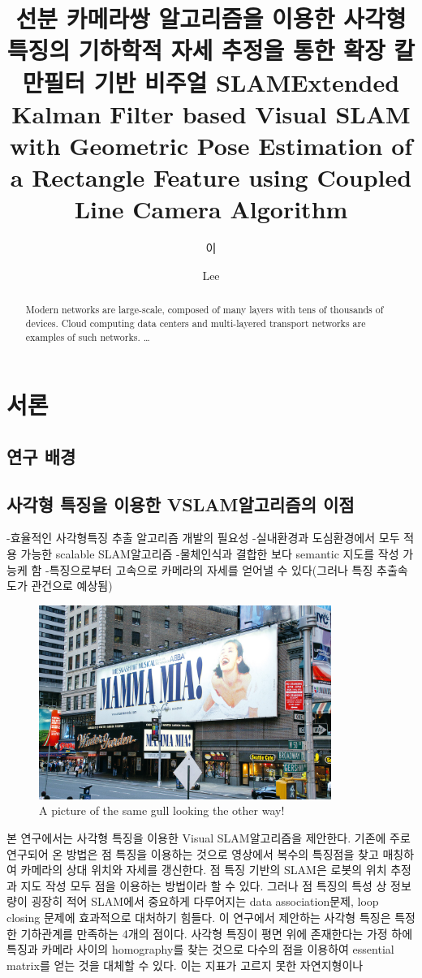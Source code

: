 \documentclass[master,korean,final]{cbnu-ecs}
\title[korean]{선분 카메라쌍 알고리즘을 이용한 사각형 특징의 기하학적 자세 추정을 통한 확장 칼만필터 기반 비주얼 SLAM}
\title[english]{Extended Kalman Filter based Visual SLAM with Geometric Pose Estimation of a Rectangle Feature using Coupled Line Camera Algorithm}
\author[korean] {이}{재 민}
\author[english]{Lee}{Jaemin}
\begin{document}
\tableofcontents

\begin{abstract}
Modern networks are large-scale, composed of many layers with tens of thousands of devices. 
Cloud computing data centers and multi-layered transport networks are 
examples of such networks.
\ldots
\end{abstract}
\listoftables

\listoffigures



\chapter{서론}

\section{연구 배경}

\section{사각형 특징을 이용한 VSLAM알고리즘의 이점}
-효율적인 사각형특징 추출 알고리즘 개발의 필요성
-실내환경과 도심환경에서 모두 적용 가능한 scalable SLAM알고리즘
-물체인식과 결합한 보다 semantic 지도를 작성 가능케 함
-특징으로부터 고속으로 카메라의 자세를 얻어낼 수 있다(그러나 특징 추출속도가 관건으로 예상됨)

\begin{figure}[!ht]
  \centering
	\includegraphics[width=360px]{BroadwayPlayers_01.jpg}
  \caption{A picture of the same gull looking the other way!}
\end{figure}
본 연구에서는 사각형 특징을 이용한 Visual SLAM알고리즘을 제안한다. 기존에 주로 연구되어 온 방법은 점 특징을 이용하는 것으로 영상에서 복수의 특징점을 찾고 매칭하여 카메라의 상대 위치와 자세를 갱신한다. 점 특징 기반의 SLAM은 로봇의 위치 추정과 지도 작성 모두 점을 이용하는 방법이라 할 수 있다. 그러나 점 특징의 특성 상 정보량이 굉장히 적어 SLAM에서 중요하게 다루어지는 data association문제, loop closing 문제에 효과적으로 대처하기 힘들다. 
이 연구에서 제안하는 사각형 특징은 특정한 기하관계를 만족하는 4개의 점이다. 사각형 특징이 평면 위에 존재한다는 가정 하에 특징과 카메라 사이의 homography를 찾는 것으로 다수의 점을 이용하여 essential matrix를 얻는 것을 대체할 수 있다. 이는 지표가 고르지 못한 자연지형이나 
\end{document}

